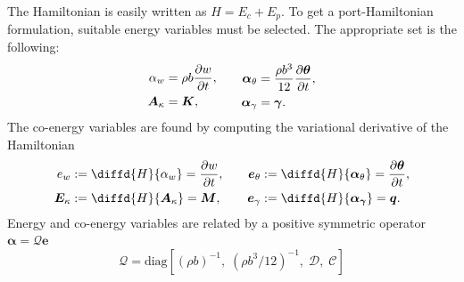 \documentclass{ifacconf}
\begin{document}
The Hamiltonian  is easily written as $H = E_c + E_p$. To get a port-Hamiltonian formulation, suitable energy variables must be selected. The appropriate set is the following:
\begin{equation}
\begin{aligned}
\alpha_w &= \rho b \diffp{w}{t}, \\
\bm{A}_{\kappa} &= \bm{K}, \\
\end{aligned} \qquad
\begin{aligned}
\bm\alpha_{\theta} &= \frac{\rho b^3}{12} \diffp{\bm{\theta}}{t}, \\
\bm\alpha_{\gamma} &= \bm{\gamma}. \\
\end{aligned}
\end{equation}
The co-energy variables are found by computing the variational derivative of the Hamiltonian
\begin{equation}
\begin{aligned}
e_w &:= \diffd{H}{\alpha_w} = \diffp{w}{t},  \\
\bm{E}_{\kappa} &:= \diffd{H}{\bm{A}_{\kappa}} = \bm{M}, \\
\end{aligned} \qquad
\begin{aligned}
\bm{e}_{\theta} &:= \diffd{H}{\bm\alpha_{\theta}} = \diffp{\bm{\theta}}{t}, \\
\bm{e}_{\gamma} &:= \diffd{H}{\bm{\alpha}_{\bm{\gamma}}} = \bm{q}. \\
\end{aligned}
\end{equation}
Energy and co-energy variables are related by a positive symmetric operator $\bm{\alpha} = \mathcal{Q} \bm{e}$
\begin{equation}
\mathcal{Q} = \mathrm{diag}[(\rho b)^{-1}, \; (\rho b^3/12)^{-1} , \; \mathcal{D}, \; \mathcal{C}]
\end{equation}
\end{document}
